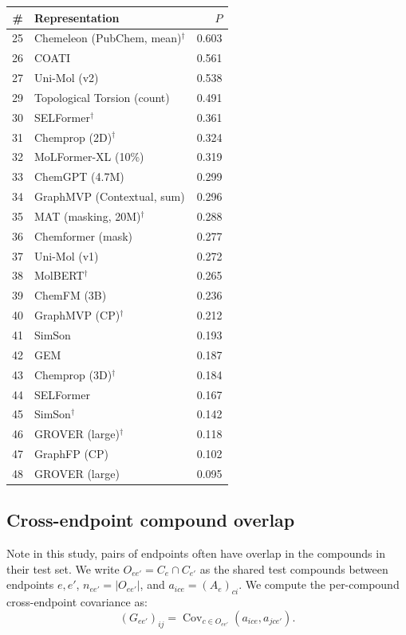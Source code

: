 \documentclass{article}
\DeclareMathOperator{\Cov}{Cov}
\begin{document}
\begin{table}[H]
\begin{tabular}[t]{@{}rlr@{}}
\bottomrule
\end{tabular}
\hfill
\begin{tabular}[t]{@{}rlr@{}}
\toprule
\# & Representation & $P$ \\
\midrule
25 & Chemeleon (PubChem, mean)$^\dagger$ & 0.603 \\
26 & COATI & 0.561 \\
27 & Uni-Mol (v2) & 0.538 \\
29 & Topological Torsion (count) & 0.491 \\
30 & SELFormer$^\dagger$ & 0.361 \\
31 & Chemprop (2D)$^\dagger$ & 0.324 \\
32 & MoLFormer-XL (10\%) & 0.319 \\
33 & ChemGPT (4.7M) & 0.299 \\
34 & GraphMVP (Contextual, sum) & 0.296 \\
35 & MAT (masking, 20M)$^\dagger$ & 0.288 \\
36 & Chemformer (mask) & 0.277 \\
37 & Uni-Mol (v1) & 0.272 \\
38 & MolBERT$^\dagger$ & 0.265 \\
39 & ChemFM (3B) & 0.236 \\
40 & GraphMVP (CP)$^\dagger$ & 0.212 \\
41 & SimSon & 0.193 \\
42 & GEM & 0.187 \\
43 & Chemprop (3D)$^\dagger$ & 0.184 \\
44 & SELFormer & 0.167 \\
45 & SimSon$^\dagger$ & 0.142 \\
46 & GROVER (large)$^\dagger$ & 0.118 \\
47 & GraphFP (CP) & 0.102 \\
48 & GROVER (large) & 0.095 \\
\bottomrule
\end{tabular}
\end{table}

\subsection{Cross-endpoint compound overlap}
Note in this study, pairs of endpoints often have overlap in the compounds in their test set. We write $O_{ee'} = C_e \cap C_{e'}$ as the shared test compounds between endpoints $e, e'$, $n_{ee'}=|O_{ee'}|$, and $a_{ice} = (A_e)_{ci}$. We compute the per-compound cross-endpoint covariance as:
\begin{equation}
    (G_{ee'})_{ij} = \Cov_{c\in O_{ee'}}(a_{ice}, a_{jce'}).
\end{equation}
\end{document}
